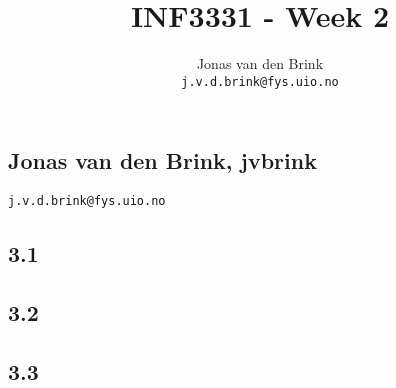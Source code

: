 \documentclass[a4paper, 11pt, titlepage, english]{article}
\title{INF3331 - Week 2}
\author{Jonas van den Brink \\ \texttt{j.v.d.brink@fys.uio.no}}
\begin{document}
\pagestyle{empty}
\subsection*{Jonas van den Brink, jvbrink}
\texttt{j.v.d.brink@fys.uio.no}
\subsection*{3.1}


\clearpage

\subsection*{3.2}

\subsection*{3.3}

\end{document}
